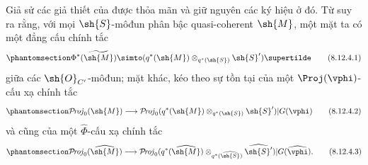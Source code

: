 \documentclass[oneside,10pt]{amsart}
\makeatletter
\newcommand{\ega@arrow}[2]{\mathchoice{#1}{#2}{#2}{#2}}
\renewcommand{\to}{\ega@arrow{\longrightarrow}{\rightarrow}}
\def\shProj{\mathcal{P}\!\mathit{roj}}
\let\EGAOriginalLabel\label
\renewcommand{\label}[1]{\phantomsection\EGAOriginalLabel{#1}}
\makeatother
\begin{document}
\begin{env}[8.12.4]
\label{II.8.12.4}
Giả sử các giả thiết của  được thỏa mãn và giữ nguyên các ký hiệu ở đó.
Từ  suy ra rằng, với mọi $\sh{S}$-môđun phân bậc quasi-coherent $\sh{M}$, một mặt ta có một đẳng cấu chính tắc
\[
\label{II.8.12.4.1}
  \Phi^*(\widetilde{\sh{M}})
  \simto
  (q^*(\sh{M})\otimes_{q^*(\sh{S})}\sh{S}')\supertilde
\tag{8.12.4.1}
\]
giữa các $\sh{O}_{C'}$-môđun;
mặt khác,  kéo theo sự tồn tại của một $\Proj(\vphi)$-cấu xạ chính tắc
\[
\label{II.8.12.4.2}
  \shProj_0(\sh{M})\to
  \shProj_0(q^*(\sh{M})\otimes_{q^*(\sh{S})}\sh{S}')
  |G(\vphi)
\tag{8.12.4.2}
\]
và cũng của một $\widehat{\Phi}$-cấu xạ chính tắc
\[
\label{II.8.12.4.3}
  \shProj_0(\widehat{\sh{M}})\to
  \shProj_0(q^*(\widehat{\sh{M}})
  \otimes_{q^*(\widehat{\sh{S}})}\widehat{\sh{S}'})
  |G(\widehat{\vphi}).
\tag{8.12.4.3}
\]
\end{env}
\end{document}
